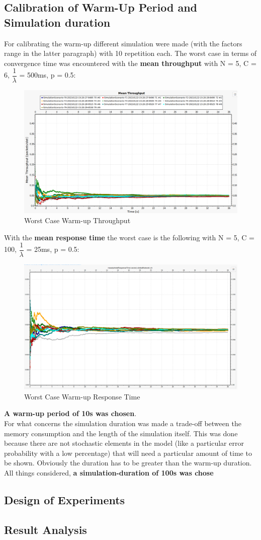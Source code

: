 \subsection{Calibration of Warm-Up Period and Simulation duration}
For calibrating the warm-up different simulation were made (with the factors range in the latter paragraph) with 10 repetition each. 
The worst case in terms of convergence time was encountered with the \textbf{mean throughput} with N = 5, C = 6, $\dfrac{1}{\lambda}$ = 500ms, p = 0.5:
\begin{figure}[H]
	\centering
	\includegraphics[width=\textwidth]{img/WorstCaseWarmUp.png}
	\caption{Worst Case Warm-up Throughput}
	\label {img: warmUp}
\end{figure}  
With the \textbf{mean response time} the worst case is the following with N = 5, C = 100, $\dfrac{1}{\lambda}$ = 25ms, p = 0.5:
\begin{figure}[H]
	\centering
	\includegraphics[width=\textwidth]{img/WorstResponseTime.png}
	\caption{Worst Case Warm-up Response Time}
	\label {img: ResponsewarmUp}
\end{figure}  
\noindent\textbf{A warm-up period of 10s was chosen}.\\
For what concerns the simulation duration was made a trade-off between the memory consumption and the length of the simulation itself. This was done because there are not stochastic elements in the model (like a particular error probability with a low percentage) that will need a particular amount of time to be shown. Obviously the duration has to be greater than the warm-up duration. All things considered, \textbf{a simulation-duration of 100s was chose}

\subsection{Design of Experiments}
\subsection{Result Analysis}